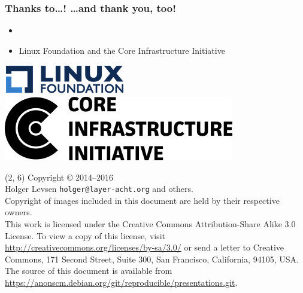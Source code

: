 \documentclass[14pt,aspectratio=169]{beamer}
\begin{document}
\begin{frame}
 \frametitle{Thanks to…! …and thank \textbf{you}, too!}

 \begin{itemize}
  \item
  \item Linux Foundation and the Core Infrastructure Initiative
\end{itemize}

 \begin{center}
  \includegraphics[height=0.1\paperheight]{images/linux_foundation_logo.png}
  \hspace{0.1\paperwidth}
  \includegraphics[height=0.1\paperheight]{images/cii_logo.png}
 \end{center}

 \vfill
 \begin{center}
 \end{center}
\end{frame}

\begin{frame}{}
\begin{textblock}{12}(2, 6)
    \tiny{
      Copyright \copyright{} 2014--2016 \\
         Holger Levsen \texttt{holger@layer-acht.org} and others.\\[3.0mm]
      Copyright of images included in this document are held by
      their respective owners.
      \\[3.0mm]
      This work is licensed under the \alert{Creative Commons
        Attribution-Share Alike 3.0} License.  To view a copy of this
      license, visit
      \url{http://creativecommons.org/licenses/by-sa/3.0/} or send a
      letter to Creative Commons, 171 Second Street, Suite 300, San
      Francisco, California, 94105, USA.
      \\[2.0mm]
      The source of this document is available from
      \url{https://anonscm.debian.org/git/reproducible/presentations.git}.
    }
  \end{textblock}
\end{frame}
\end{document}

